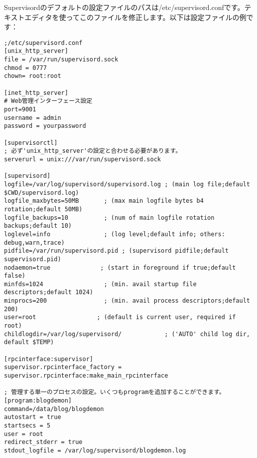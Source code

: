 Supervisordのデフォルトの設定ファイルのパスは/etc/supervisord.confです。テキストエディタを使ってこのファイルを修正します。以下は設定ファイルの例です：

\begin{lstlisting}[numbers=none]
;/etc/supervisord.conf
[unix_http_server]
file = /var/run/supervisord.sock
chmod = 0777
chown= root:root

[inet_http_server]
# Web管理インターフェース設定
port=9001
username = admin
password = yourpassword

[supervisorctl]
; 必ず'unix_http_server'の設定と合わせる必要があります。
serverurl = unix:///var/run/supervisord.sock

[supervisord]
logfile=/var/log/supervisord/supervisord.log ; (main log file;default $CWD/supervisord.log)
logfile_maxbytes=50MB       ; (max main logfile bytes b4 rotation;default 50MB)
logfile_backups=10          ; (num of main logfile rotation backups;default 10)
loglevel=info               ; (log level;default info; others: debug,warn,trace)
pidfile=/var/run/supervisord.pid ; (supervisord pidfile;default supervisord.pid)
nodaemon=true              ; (start in foreground if true;default false)
minfds=1024                 ; (min. avail startup file descriptors;default 1024)
minprocs=200                ; (min. avail process descriptors;default 200)
user=root                 ; (default is current user, required if root)
childlogdir=/var/log/supervisord/            ; ('AUTO' child log dir, default $TEMP)

[rpcinterface:supervisor]
supervisor.rpcinterface_factory = supervisor.rpcinterface:make_main_rpcinterface

; 管理する単一のプロセスの設定。いくつもprogramを追加することができます。
[program:blogdemon]
command=/data/blog/blogdemon
autostart = true
startsecs = 5
user = root
redirect_stderr = true
stdout_logfile = /var/log/supervisord/blogdemon.log
\end{lstlisting}



